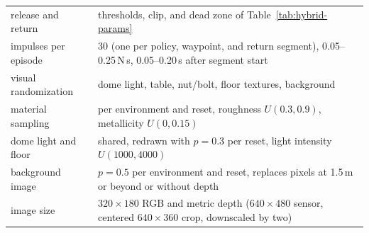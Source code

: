\begin{table}[!htbp]
\begin{tabularx}{\textwidth}{lY}
        release and return & thresholds, clip, and dead zone of Table~\ref{tab:hybrid-params} \\
        impulses per episode & 30 (one per policy, waypoint, and return segment), 0.05--0.25\,N\,s, 0.05--0.20\,s after segment start \\
        visual randomization & dome light, table, nut/bolt, floor textures, background \\
        material sampling & per environment and reset, roughness $U(0.3,0.9)$, metallicity $U(0,0.15)$ \\
        dome light and floor & shared, redrawn with $p=0.3$ per reset, light intensity $U(1000,4000)$ \\
        background image & $p=0.5$ per environment and reset, replaces pixels at 1.5\,m or beyond or without depth \\
        image size & $320\times180$ RGB and metric depth ($640\times480$ sensor, centered $640\times360$ crop, downscaled by two) \\
        \bottomrule
    \end{tabularx}
\end{table}%
